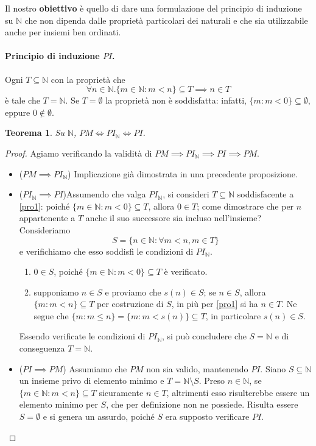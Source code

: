\documentclass[fontsize = 11 pt, paper=A4, oneside, index=totoc, hyperref]{book}
\theoremstyle{definition}
\theoremstyle{plain}
\newtheorem{thm}{Teorema}[section]
\newcommand{\N}{\mathbb{N}}
\begin{document}
Il nostro {\bf obiettivo} è quello di dare una formulazione del principio di induzione su \(\N\) che non dipenda dalle proprietà particolari dei naturali e che sia utilizzabile anche per insiemi ben ordinati.

\paragraph{Principio di induzione \(PI\).} Ogni \(T \subseteq \N\) con la proprietà che
\begin{equation}
\forall n \in \N. \lbrace m \in \N \colon m < n\rbrace \subseteq T \implies n \in T \label{pro1}
\end{equation}
è tale che \(T = \N\). Se \(T = \emptyset\) la proprietà non è soddisfatta: infatti, \(\lbrace m \colon m < 0\rbrace \subseteq \emptyset\), eppure \(0 \notin \emptyset\).

\begin{thm}
  Su \(\N\), \(PM \iff PI_\N \iff PI\).
\end{thm}
\begin{proof}
  Agiamo verificando la validità di \(PM \implies PI_\N \implies PI \implies PM\).
  \begin{itemize}
    \item{(\(PM \implies PI_\N\))\quad} Implicazione già dimostrata in una precedente proposizione.
    \item{(\(PI_\N \implies PI\))\quad}Assumendo che valga \(PI_\N\), si consideri \(T \subseteq \N\) soddisfacente a \eqref{pro1}: poiché \(\lbrace m \in \N \colon m < 0\rbrace \subseteq T\), allora \(0 \in T\); come dimostrare che per \(n\) appartenente a \(T\) anche il suo successore sia incluso nell'insieme? Consideriamo
    \[
    S = \lbrace n \in \N \colon \forall m < n, m \in T\rbrace
    \]
    e verifichiamo che esso soddisfi le condizioni di \(PI_\N\).
    \begin{enumerate}
      \item \(0 \in S\), poiché \(\lbrace m \in \N \colon m < 0\rbrace \subseteq T\) è verificato.
      \item supponiamo \(n \in S\) e proviamo che \(s(n) \in S\); se \(n \in S\), allora \(\lbrace m \colon m < n\rbrace \subseteq T\) per costruzione di \(S\), in più per \eqref{pro1} si ha \(n \in T\). Ne segue che \(\lbrace m \colon m \le n\rbrace = \lbrace m \colon m < s(n)\rbrace \subseteq T\), in particolare \(s(n) \in S\).
    \end{enumerate}
    Essendo verificate le condizioni di \(PI_\N\), si può concludere che \(S = \N\) e di conseguenza \(T = \N\).

    \item{(\(PI \implies PM\))\quad} Assumiamo che \(PM\) non sia valido, mantenendo \(PI\). Siano \(S \subseteq \N\) un insieme privo di elemento minimo e \(T = \N \setminus S\). Preso \(n \in \N\), se \(\lbrace m \in \N \colon m < n\rbrace \subseteq T\) sicuramente \(n \in T\), altrimenti esso risulterebbe essere un elemento minimo per \(S\), che per definizione non ne possiede. Risulta essere \(S = \emptyset\) e si genera un assurdo, poiché \(S\) era supposto verificare \(PI\).
\end{itemize}
  \end{proof}
\end{document}
